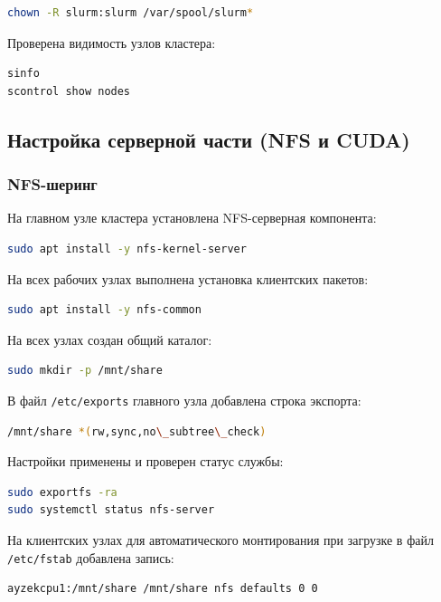 \documentclass[areaset=advanced]{scrartcl}
\begin{document}
\begin{lstlisting}[language=bash]
chown -R slurm:slurm /var/spool/slurm*
\end{lstlisting}

Проверена видимость узлов кластера:

\begin{lstlisting}[language=bash]
sinfo
scontrol show nodes
\end{lstlisting}

\subsection{Настройка серверной части (NFS и CUDA)}
\subsubsection{NFS-шеринг}
На главном узле кластера установлена NFS-серверная компонента:

\begin{lstlisting}[language=bash]
sudo apt install -y nfs-kernel-server
\end{lstlisting}

На всех рабочих узлах выполнена установка клиентских пакетов:

\begin{lstlisting}[language=bash]
sudo apt install -y nfs-common
\end{lstlisting}

На всех узлах создан общий каталог:

\begin{lstlisting}[language=bash]
sudo mkdir -p /mnt/share
\end{lstlisting}

В файл \texttt{/etc/exports} главного узла добавлена строка экспорта:

\begin{lstlisting}[language=bash]
/mnt/share *(rw,sync,no\_subtree\_check)
\end{lstlisting}

Настройки применены и проверен статус службы:

\begin{lstlisting}[language=bash]
sudo exportfs -ra
sudo systemctl status nfs-server
\end{lstlisting}

На клиентских узлах для автоматического монтирования при загрузке в файл \texttt{/etc/fstab} добавлена запись:

\begin{lstlisting}[language=bash]
ayzekcpu1:/mnt/share /mnt/share nfs defaults 0 0
\end{lstlisting}
\end{document}

